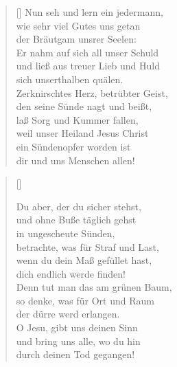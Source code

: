 \begin{multicols}{2}
\begin{verse}[\versewidth]
 Nun seh und lern ein jedermann,\\
wie sehr viel Gutes uns getan\\
der Bräutgam unsrer Seelen:\\
Er nahm auf sich all unser Schuld\\
und ließ aus treuer Lieb und Huld\\
sich unserthalben quälen.\\
Zerknirschtes Herz, betrübter Geist,\\
den seine Sünde nagt und beißt,\\
laß Sorg und Kummer fallen,\\
weil unser Heiland Jesus Christ\\
ein Sündenopfer worden ist\\
dir und uns Menschen allen!

\end{verse}
\end{multicols}

\begin{center}
\settowidth{\versewidth}{Der, vor dem die Welt erschrickt,}
\begin{verse}[\versewidth]

 Du aber, der du sicher stehst,\\
und ohne Buße täglich gehst\\
in ungescheute Sünden,\\
betrachte, was für Straf und Last,\\
wenn du dein Maß gefüllet hast,\\
dich endlich werde finden!\\
Denn tut man das am grünen Baum,\\
so denke, was für Ort und Raum\\
der dürre werd erlangen.\\
O Jesu, gibt uns deinen Sinn\\
und bring uns alle, wo du hin\\
durch deinen Tod gegangen!
  
\end{verse}
\end{center}




